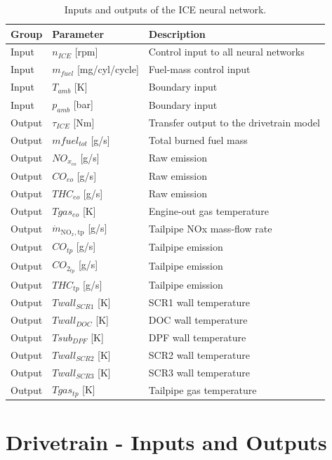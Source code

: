 \begin{table}[H]
  \centering
  \begin{tabular}{|l|l|l|}
    \hline
    \textbf{Group} & \textbf{Parameter} & \textbf{Description} \\
    \hline
    Input & $n_{ICE}$ [rpm] & Control input to all neural networks \\
    Input & $m_{fuel}$ [mg/cyl/cycle] & Fuel-mass control input \\
    Input & $T_{amb}$ [K] & Boundary input \\
    Input & $p_{amb}$ [bar] & Boundary input \\
    Output & $\tau_{ICE}$ [Nm] & Transfer output to the drivetrain model \\
    Output & $mfuel_{tot}$ [g/s] & Total burned fuel mass \\
    Output & $NO_{x_{eo}}$ [g/s] & Raw emission \\
    Output & $CO_{eo}$ [g/s] & Raw emission \\
    Output & $THC_{eo}$ [g/s] & Raw emission \\
    Output & $Tgas_{eo}$ [K] & Engine-out gas temperature \\
    Output & $\dot m_{\mathrm{NO}_{x},\mathrm{tp}}$ [g/s] & Tailpipe NOx mass-flow rate \\
    Output & $CO_{tp}$ [g/s] & Tailpipe emission \\
    Output & $CO_{2_{tp}}$ [g/s] & Tailpipe emission \\
    Output & $THC_{tp}$ [g/s] & Tailpipe emission \\
    Output & $Twall_{SCR1}$ [K] & SCR1 wall temperature \\
    Output & $Twall_{DOC}$ [K] & DOC wall temperature \\
    Output & $Tsub_{DPF}$ [K] & DPF wall temperature \\
    Output & $Twall_{SCR2}$ [K] & SCR2 wall temperature \\
    Output & $Twall_{SCR3}$ [K] & SCR3 wall temperature \\
    Output & $Tgas_{tp}$ [K] & Tailpipe gas temperature \\
    \hline
  \end{tabular}
  \caption[ICE neural-network inputs and outputs]{Inputs and outputs of the ICE neural network.}
  \label{tab:ice_io}
\end{table}

\section{Drivetrain - Inputs and Outputs}

